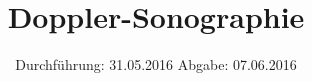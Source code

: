 

\subject{US3}
\title{Doppler-Sonographie}
\date{
  Durchführung: 31.05.2016
  \hspace{3em}
  Abgabe: 07.06.2016
}



\maketitle
\thispagestyle{empty}
\tableofcontents
\newpage






\printbibliography


